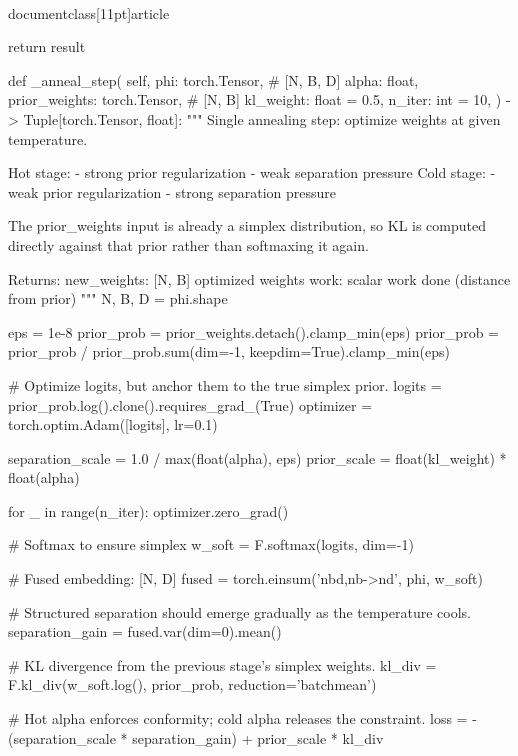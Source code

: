 \\documentclass[11pt]{article}
\begin{document}
\begin{CodeBlock}
{{{{{{{{        return result

    def _anneal_step(
        self,
        phi: torch.Tensor,  # [N, B, D]
        alpha: float,
        prior_weights: torch.Tensor,  # [N, B]
        kl_weight: float = 0.5,
        n_iter: int = 10,
    ) -> Tuple[torch.Tensor, float]:
        """
        Single annealing step: optimize weights at given temperature.

        Hot stage:
            - strong prior regularization
            - weak separation pressure
        Cold stage:
            - weak prior regularization
            - strong separation pressure

        The prior_weights input is already a simplex distribution, so KL is
        computed directly against that prior rather than softmaxing it again.

        Returns:
            new_weights: [N, B] optimized weights
            work: scalar work done (distance from prior)
        """
        N, B, D = phi.shape

        eps = 1e-8
        prior_prob = prior_weights.detach().clamp_min(eps)
        prior_prob = prior_prob / prior_prob.sum(dim=-1, keepdim=True).clamp_min(eps)

        # Optimize logits, but anchor them to the true simplex prior.
        logits = prior_prob.log().clone().requires_grad_(True)
        optimizer = torch.optim.Adam([logits], lr=0.1)

        separation_scale = 1.0 / max(float(alpha), eps)
        prior_scale = float(kl_weight) * float(alpha)

        for _ in range(n_iter):
            optimizer.zero_grad()

            # Softmax to ensure simplex
            w_soft = F.softmax(logits, dim=-1)

            # Fused embedding: [N, D]
            fused = torch.einsum('nbd,nb->nd', phi, w_soft)

            # Structured separation should emerge gradually as the temperature cools.
            separation_gain = fused.var(dim=0).mean()

            # KL divergence from the previous stage's simplex weights.
            kl_div = F.kl_div(w_soft.log(), prior_prob, reduction='batchmean')

            # Hot alpha enforces conformity; cold alpha releases the constraint.
            loss = -(separation_scale * separation_gain) + prior_scale * kl_div

}}}}}}}}
\end{CodeBlock}
\end{document}
